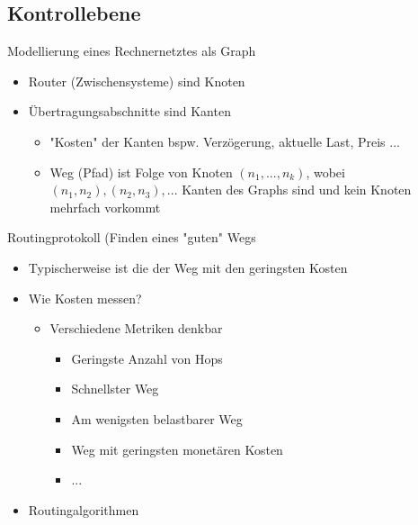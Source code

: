   \subsection{Kontrollebene}
    Modellierung eines Rechnernetztes als Graph
    \begin{itemize}
      \item Router (Zwischensysteme) sind Knoten
      \item Übertragungsabschnitte sind Kanten
        \begin{itemize}
          \item "Kosten" der Kanten bspw. Verzögerung, aktuelle Last, Preis ...
          \item Weg (Pfad) ist Folge von Knoten $(n_1,...,n_k)$, wobei $(n_1,n_2),(n_2,n_3),...$ Kanten
            des Graphs sind und kein Knoten mehrfach vorkommt
        \end{itemize}
    \end{itemize}
    Routingprotokoll (Finden eines "guten" Wegs
    \begin{itemize}
      \item Typischerweise ist die der Weg mit den geringsten Kosten
      \item Wie Kosten messen?
        \begin{itemize}
          \item Verschiedene Metriken denkbar
            \begin{itemize}
              \item Geringste Anzahl von Hops
              \item Schnellster Weg
              \item Am wenigsten belastbarer Weg
              \item Weg mit geringsten monetären Kosten
              \item ...
            \end{itemize}
        \end{itemize}
      \item Routingalgorithmen
    \end{itemize}
